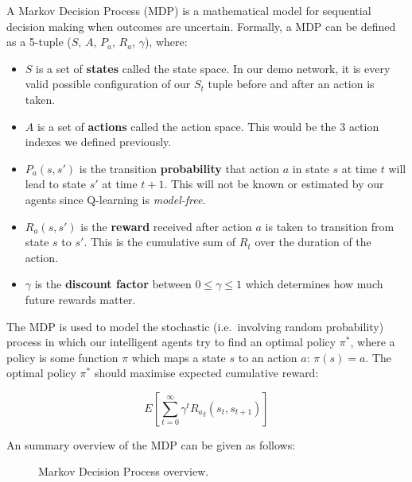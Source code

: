 \documentclass[a4paper]{report}
\begin{document}
A Markov Decision Process (MDP) is a mathematical model for sequential decision making when outcomes are uncertain. Formally, a MDP can be defined as a 5-tuple ($S$, $A$, $P_a$, $R_a$, $\gamma$), where:

\begin{itemize}
  \item $S$ is a set of \textbf{states} called the state space. In our demo network, it is every valid possible configuration of our $S_t$ tuple before and after an action is taken.
  \item $A$ is a set of \textbf{actions} called the action space. This would be the 3 action indexes we defined previously.
  \item $P_a(s,s')$ is the transition \textbf{probability} that action $a$ in state $s$ at time $t$ will lead to state $s'$ at time $t+1$. This will not be known or estimated by our agents since Q-learning is \emph{model-free}.
  \item $R_a(s,s')$ is the \textbf{reward} received after action $a$ is taken to transition from state $s$ to $s'$. This is the cumulative sum of $R_t$ over the duration of the action.
  \item $\gamma$ is the \textbf{discount factor} between $0 \leq \gamma \leq 1$ which determines how much future rewards matter.  
\end{itemize}

The MDP is used to model the stochastic (i.e.\ involving random probability) process in which our intelligent agents try to find an optimal policy $\pi^*$, where a policy is some function $\pi$ which maps a state $s$ to an action $a$: $\pi(s)=a$. The optimal policy $\pi^*$ should maximise expected cumulative reward:

\[
E\left[\sum_{t=0}^{\infty}\gamma^t{R_a}_t(s_t,s_{t+1})\right]
\]

An summary overview of the MDP can be given as follows:

\begin{figure}[H]
  \centering
  \caption{Markov Decision Process overview.}
  \label{fig:markov_decision_process}
\end{figure}
\end{document}
